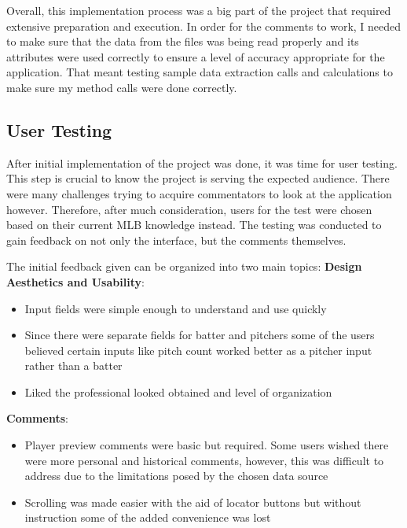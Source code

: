 \documentclass[10pt,twocolumn]{article}
\begin{document}
Overall, this implementation process was a big part of the project that required extensive preparation and execution. In order for the comments to work, I needed to make sure that the data from the files was being read properly and its attributes were used correctly to ensure a level of accuracy appropriate for the application. That meant testing sample data extraction calls and calculations to make sure my method calls were done correctly.  

\subsection{User Testing}

After initial implementation of the project was done, it was time for user testing. This step is crucial to know the project is serving the expected audience. There were many challenges trying to acquire commentators to look at the application however. Therefore, after much consideration, users for the test were chosen based on their current MLB knowledge instead. The testing was conducted to gain feedback on not only the interface, but the comments themselves. 

The initial feedback given can be organized into two main topics: 
\newline
\textbf{Design Aesthetics and Usability}: 

\begin{itemize}
    \item Input fields were simple enough to understand and use quickly
    \item Since there were separate fields for batter and pitchers some of the users believed certain inputs like pitch count worked better as a pitcher input rather than a batter
    \item Liked the professional looked obtained and level of organization
\end{itemize}

\newline 
\textbf{Comments}: 

\begin{itemize}
    \item Player preview comments were basic but required. Some users wished there were more personal and historical comments, however, this was difficult to address due to the limitations posed by the chosen data source
    \item Scrolling was made easier with the aid of locator buttons but without instruction some of the added convenience was lost 
\end{itemize}
\end{document}
